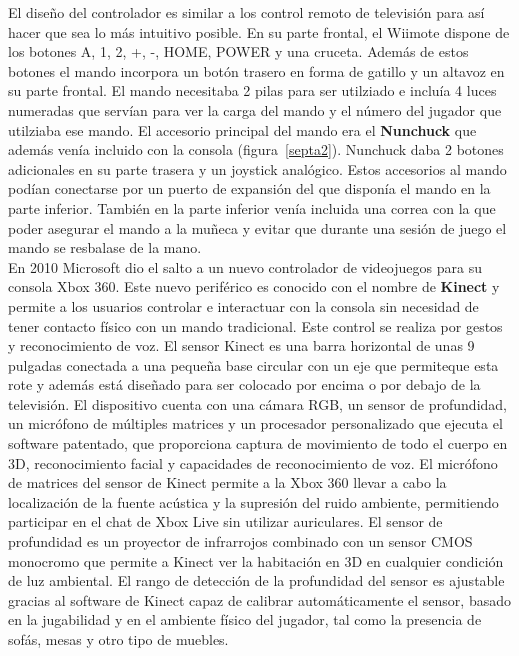 El dise\~no del controlador es similar a los control remoto de televisi\'on para as\'i hacer que sea lo m\'as intuitivo posible. En su parte frontal, el Wiimote dispone de los botones A, 1, 2, +, -, HOME, POWER y una cruceta. Adem\'as de estos botones el mando incorpora un bot\'on trasero en forma de gatillo y un altavoz en su parte frontal. El mando necesitaba 2 pilas para ser utilziado e inclu\'ia 4 luces numeradas que serv\'ian para ver la carga del mando y el n\'umero del jugador que utilziaba ese mando. El accesorio principal del mando era el \textbf{Nunchuck} que adem\'as ven\'ia incluido con la consola (figura~\ref{septa2}). Nunchuck daba 2 botones adicionales en su parte trasera y un joystick anal\'ogico. Estos accesorios al mando pod\'ian conectarse por un puerto de expansi\'on del que dispon\'ia el mando en la parte inferior. Tambi\'en en la parte inferior ven\'ia incluida una correa con la que poder asegurar el mando a la mu\~neca y evitar que durante una sesi\'on de juego el mando se resbalase de la mano.\\


En 2010 Microsoft dio el salto a un nuevo controlador de videojuegos para su consola Xbox 360. Este nuevo perif\'erico es conocido con el nombre de \textbf{Kinect} y permite a los usuarios controlar e interactuar con la consola sin necesidad de tener contacto f\'isico con un mando tradicional. Este control se realiza por gestos y reconocimiento de voz. El sensor Kinect es una barra horizontal de unas 9 pulgadas conectada a una peque\~na base circular con un eje que permiteque esta rote y adem\'as est\'a dise\~nado para ser colocado por encima o por debajo de la televisi\'on. El dispositivo cuenta con una c\'amara RGB, un sensor de profundidad, un micr\'ofono de m\'ultiples matrices y un procesador personalizado que ejecuta el software patentado, que proporciona captura de movimiento de todo el cuerpo en 3D, reconocimiento facial y capacidades de reconocimiento de voz. El micr\'ofono de matrices del sensor de Kinect permite a la Xbox 360 llevar a cabo la localizaci\'on de la fuente ac\'ustica y la supresi\'on del ruido ambiente, permitiendo participar en el chat de Xbox Live sin utilizar auriculares. El sensor de profundidad es un proyector de infrarrojos combinado con un sensor CMOS monocromo que permite a Kinect ver la habitaci\'on en 3D en cualquier condici\'on de luz ambiental. El rango de detecci\'on de la profundidad del sensor es ajustable gracias al software de Kinect capaz de calibrar autom\'aticamente el sensor, basado en la jugabilidad y en el ambiente f\'isico del jugador, tal como la presencia de sof\'as, mesas y otro tipo de muebles.\\

